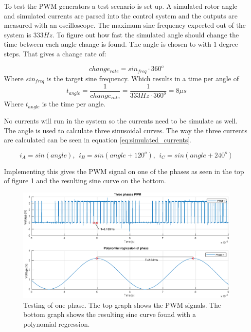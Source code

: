 To test the PWM generators a test scenario is set up. A simulated rotor angle and simulated currents are parsed into the control system and the outputs are measured with an oscilloscope. 
The maximum sine frequency expected out of the system is $333Hz$. To figure out how fast the simulated angle should change the time between each angle change is found. 
The angle is chosen to with $1$ degree steps. That gives a change rate of:


\begin{equation}
    change_{rate} = sin_{freq} \cdot 360^o
\end{equation}
Where $sin_{freq}$ is the target sine frequency. Which results in a time per angle of
\begin{equation}
    t_{angle} = \frac{1}{change_{rate}} = \frac{1}{333Hz \cdot 360^o} = 8 \mu s
\end{equation}
Where $t_{angle}$ is the time per angle. 

No currents will run in the system so the currents need to be simulate as well. The angle is used to calculate three sinusoidal curves. The way the three currents are calculated can be seen in equation \ref{eq:simulated_currents}.

\begin{equation}
    i_A = sin(angle), \ \ i_B = sin(angle + 120^o), \ \ i_C = sin(angle + 240^o)
    \label{eq:simulated_currents}
\end{equation}


Implementing this gives the PWM signal on one of the phases as seen in the top of figure \ref{fig:one_phase} and the resulting sine curve on the bottom.

\begin{figure}[H]
	\centering
	\includegraphics[width=1 \textwidth]{pictures/software/one_phase.eps}
	\caption{Testing of one phase. The top graph shows the PWM signals. The bottom graph shows the resulting sine curve found with a polynomial regression.}
	\label{fig:one_phase}
\end{figure}

